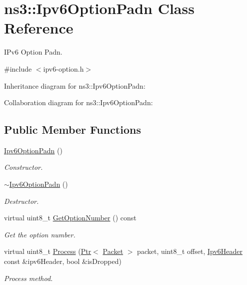 \hypertarget{classns3_1_1Ipv6OptionPadn}{}\section{ns3\+:\+:Ipv6\+Option\+Padn Class Reference}
\label{classns3_1_1Ipv6OptionPadn}


I\+Pv6 Option Padn.  




{\ttfamily \#include $<$ipv6-\/option.\+h$>$}



Inheritance diagram for ns3\+:\+:Ipv6\+Option\+Padn\+:


Collaboration diagram for ns3\+:\+:Ipv6\+Option\+Padn\+:
\subsection*{Public Member Functions}
\begin{DoxyCompactItemize}
\item 
\hyperlink{classns3_1_1Ipv6OptionPadn_ad5e0cdb4f20a72afd39352752a207def}{Ipv6\+Option\+Padn} ()
\begin{DoxyCompactList}\small\item\em Constructor. \end{DoxyCompactList}\item 
\hyperlink{classns3_1_1Ipv6OptionPadn_a630245fe73ffb36683f5013ca79b2505}{$\sim$\+Ipv6\+Option\+Padn} ()
\begin{DoxyCompactList}\small\item\em Destructor. \end{DoxyCompactList}\item 
virtual uint8\+\_\+t \hyperlink{classns3_1_1Ipv6OptionPadn_a852b68a3fc75fc3dc73350018bb136d1}{Get\+Option\+Number} () const 
\begin{DoxyCompactList}\small\item\em Get the option number. \end{DoxyCompactList}\item 
virtual uint8\+\_\+t \hyperlink{classns3_1_1Ipv6OptionPadn_a38129b77d85811f13ed85e5ceed1e096}{Process} (\hyperlink{classns3_1_1Ptr}{Ptr}$<$ \hyperlink{classns3_1_1Packet}{Packet} $>$ packet, uint8\+\_\+t offset, \hyperlink{classns3_1_1Ipv6Header}{Ipv6\+Header} const \&ipv6\+Header, bool \&is\+Dropped)
\begin{DoxyCompactList}\small\item\em Process method. \end{DoxyCompactList}\end{DoxyCompactItemize}
